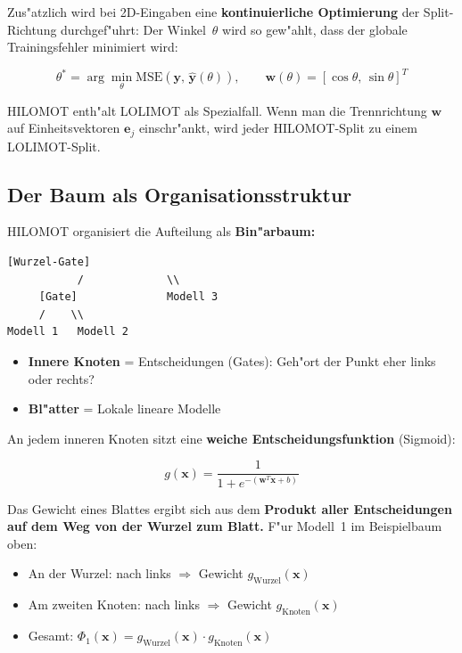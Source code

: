 \documentclass[12pt,a4paper]{article}
\begin{document}
Zus"atzlich wird bei 2D-Eingaben eine \textbf{kontinuierliche Optimierung} der Split-Richtung durchgef"uhrt: Der Winkel~$\theta$ wird so gew"ahlt, dass der globale Trainingsfehler minimiert wird:

\begin{equation}
  \theta^* = \arg\min_\theta \mathrm{MSE}\left(\mathbf{y},\, \hat{\mathbf{y}}(\theta)\right),
  \qquad \mathbf{w}(\theta) = [\cos\theta,\, \sin\theta]^T
\end{equation}

\begin{merkbox}
HILOMOT enth"alt LOLIMOT als Spezialfall. Wenn man die Trennrichtung $\mathbf{w}$ auf Einheitsvektoren $\mathbf{e}_j$ einschr"ankt, wird jeder HILOMOT-Split zu einem LOLIMOT-Split.
\end{merkbox}

\subsection{Der Baum als Organisationsstruktur}

HILOMOT organisiert die Aufteilung als \textbf{Bin"arbaum:}

\begin{lstlisting}[caption={Beispielbaum mit zwei Gate-Knoten und drei Bl"attern},language={}
]
            [Wurzel-Gate]
           /             \\
     [Gate]              Modell 3
     /    \\
Modell 1   Modell 2
\end{lstlisting}

\begin{itemize}
  \item \textbf{Innere Knoten} = Entscheidungen (Gates): \glqq Geh"ort der Punkt eher links oder rechts?\grqq{}
  \item \textbf{Bl"atter} = Lokale lineare Modelle
\end{itemize}

An jedem inneren Knoten sitzt eine \textbf{weiche Entscheidungsfunktion} (Sigmoid):

\begin{equation}
  g(\mathbf{x}) = \frac{1}{1 + e^{-(\mathbf{w}^T \mathbf{x} + b)}}
\end{equation}

Das Gewicht eines Blattes ergibt sich aus dem \textbf{Produkt aller Entscheidungen auf dem Weg von der Wurzel zum Blatt.} F"ur Modell~1 im Beispielbaum oben:
\begin{itemize}
  \item An der Wurzel: \glqq nach links\grqq{} $\Rightarrow$ Gewicht $g_{\mathrm{Wurzel}}(\mathbf{x})$
  \item Am zweiten Knoten: \glqq nach links\grqq{} $\Rightarrow$ Gewicht $g_{\mathrm{Knoten}}(\mathbf{x})$
  \item Gesamt: $\Phi_1(\mathbf{x}) = g_{\mathrm{Wurzel}}(\mathbf{x}) \cdot g_{\mathrm{Knoten}}(\mathbf{x})$
\end{itemize}
\end{document}
